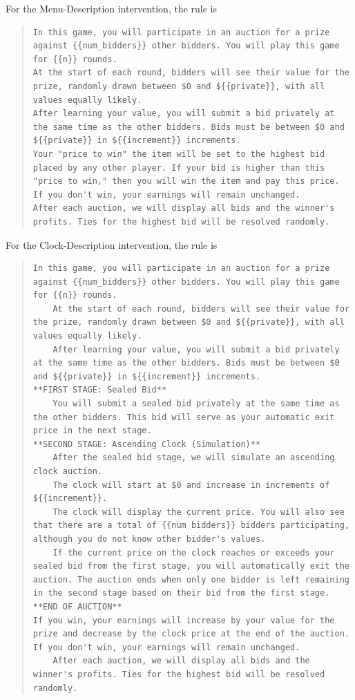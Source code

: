 \documentclass{article} %
\begin{document}
For the Menu-Description intervention, the rule is

\begin{quote}
\begin{lstlisting}[basicstyle=\ttfamily, breaklines=true]
In this game, you will participate in an auction for a prize against {{num_bidders}} other bidders. You will play this game for {{n}} rounds.
At the start of each round, bidders will see their value for the prize, randomly drawn between $0 and ${{private}}, with all values equally likely.
After learning your value, you will submit a bid privately at the same time as the other bidders. Bids must be between $0 and ${{private}} in ${{increment}} increments.
Your "price to win" the item will be set to the highest bid placed by any other player. If your bid is higher than this "price to win," then you will win the item and pay this price. If you don't win, your earnings will remain unchanged.
After each auction, we will display all bids and the winner's profits. Ties for the highest bid will be resolved randomly.\end{lstlisting}
\end{quote}

For the Clock-Description intervention, the rule is

\begin{quote}
\begin{lstlisting}[basicstyle=\ttfamily, breaklines=true]
In this game, you will participate in an auction for a prize against {{num_bidders}} other bidders. You will play this game for {{n}} rounds.
    At the start of each round, bidders will see their value for the prize, randomly drawn between $0 and ${{private}}, with all values equally likely.
    After learning your value, you will submit a bid privately at the same time as the other bidders. Bids must be between $0 and ${{private}} in ${{increment}} increments.
**FIRST STAGE: Sealed Bid**
    You will submit a sealed bid privately at the same time as the other bidders. This bid will serve as your automatic exit price in the next stage.
**SECOND STAGE: Ascending Clock (Simulation)**
    After the sealed bid stage, we will simulate an ascending clock auction.
    The clock will start at $0 and increase in increments of ${{increment}}.
    The clock will display the current price. You will also see that there are a total of {{num bidders}} bidders participating, although you do not know other bidder's values.
    If the current price on the clock reaches or exceeds your sealed bid from the first stage, you will automatically exit the auction. The auction ends when only one bidder is left remaining in the second stage based on their bid from the first stage.
**END OF AUCTION**
If you win, your earnings will increase by your value for the prize and decrease by the clock price at the end of the auction. If you don't win, your earnings will remain unchanged.
    After each auction, we will display all bids and the winner's profits. Ties for the highest bid will be resolved randomly.\end{lstlisting}
\end{quote}
\end{document}
